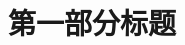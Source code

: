 \documentclass[../main.tex]{subfiles} %
\begin{document}
\part{第一部分标题}

\lipsum[1-3]%



\end{document}
